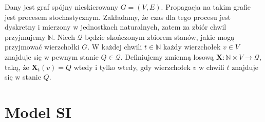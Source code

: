 

Dany jest graf spójny nieskierowany $G = (V, E)$. Propagacja na takim grafie jest procesem stochastycznym. Zakładamy, że czas dla tego procesu jest dyskretny i mierzony w jednostkach naturalnych, zatem za zbiór chwil przyjmujemy $\mathbb{N}$.  
Niech $\mathcal{Q}$ będzie skończonym zbiorem stanów, jakie mogą przyjmować wierzchołki $G$.  
W każdej chwili $t \in \mathbb{N}$ każdy wierzchołek $v \in V$ znajduje się w pewnym stanie $Q \in \mathcal{Q}$.  
Definiujemy zmienną losową $ \mathbf{X} : \mathbb{N}\times V \to \mathcal{Q} $,
taką, że $\mathbf{X}_t(v) = Q$ wtedy i tylko wtedy, gdy wierzchołek $v$ w chwili $t$ znajduje się w stanie $Q$.

\section{Model SI}

